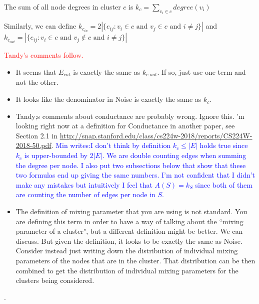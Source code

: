 \documentclass[aps,pre,superscriptaddress]{revtex4}
\begin{document}
The sum of all node degrees in cluster $c$ is $k_{c} = \sum_{v_{i} \in c}{degree(v_{i})}$

Similarly, we can define $k_{c_{in}} = 2|\{e_{ij} : v_{i} \in c \text{ and } v_{j} \in c \text{ and } i \neq j\}|$ and $k_{c_{out}} = |\{e_{ij} : v_{i} \in c \text { and } v_{j} \notin c \text{ and } i \neq j\}|$






\vspace{.1in}
\textcolor{red}{Tandy's comments follow. }

\begin{itemize}

	\item It seems that $E_{cut}$ is exactly the same as $k_{c\_out}$. If so, just use one term and not the other.
	\item It looks like the denominator in Noise is exactly the same as $k_c$.
	\item Tandy;s comments about conductance are probably wrong. Ignore this.
	      'm looking right now at a definition for Conductance in another paper, see Section 2.1 in \url{http://snap.stanford.edu/class/cs224w-2018/reports/CS224W-2018-50.pdf}.    \textcolor{blue}{Min writes:I don't think by definition $k_{c} \leq |E|$ holds true since $k_{c}$ is upper-bounded by $2|E|$. We are double counting edges when summing the degree per node. I also put two subsections below that show that these two formulas end up giving the same numbers. I'm not confident that I didn't make any mistakes but intuitively I feel that $A(S)=k_{S}$ since both of them are counting the number of edges per node in $S$.}
	\item The definition of mixing parameter that you are using is not standard.  You are defining this term in order to have a way of talking about the ``mixing parameter of a cluster", but a different definition might be better. We can discuss.
	      But given the definition, it looks to be exactly the same as Noise.
	      Consider instead just writing down the distribution of individual mixing parameters of the nodes that are in the cluster.
	      That distribution can be then combined to
	      get the distribution of individual mixing
	      parameters for the clusters being considered.
\end{itemize}.
\end{document}
